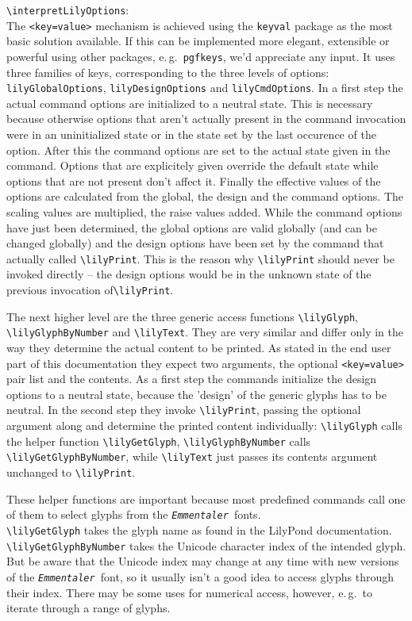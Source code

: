 \documentclass{article}
\newcommand*{\emmentaler}{\texttt{\textit{Emmentaler }}}
\newcommand*{\cmd}[1]{\texttt{\textbackslash #1}}
\begin{document}
\cmd{interpretLilyOptions}:\\
The \texttt{<key=value>} mechanism is achieved using the \texttt{keyval} package as the most basic solution available.
{\color{red} If this can be implemented more elegant, extensible or powerful using other packages, e.\,g.\ \texttt{pgfkeys}, we'd appreciate any input.}
It uses three families of keys, corresponding to the three levels of options:
\texttt{lilyGlobalOptions}, \texttt{lilyDesignOptions} and \texttt{lilyCmdOptions}.
In a first step the actual command options are initialized to a neutral state.
This is necessary because otherwise options that aren't actually present in the command invocation were in an uninitialized state or in the state set by the last occurence of the option.
After this the command options are set to the actual state given in the command.
Options that are explicitely given override the default state while options that are not present don't affect it.
Finally the effective values of the options are calculated from the global, the design and the command options. 
The scaling values are multiplied, the raise values added.
While the command options have just been determined, the global options are valid globally (and can be changed globally) and the design options have been set by the command that actually called \cmd{lilyPrint}.
This is the reason why \cmd{lilyPrint} should never be invoked directly -- the design options would be in the unknown state of the previous invocation of\cmd{lilyPrint}.

\medskip
The next higher level are the three generic access functions \cmd{lilyGlyph}, \cmd{lilyGlyphByNumber} and \cmd{lilyText}.
They are very similar and differ only in the way they determine the actual content to be printed.
As stated in the end user part of this documentation they expect two arguments, the optional \texttt{<key=value>} pair list and the contents.
As a first step the commands initialize the design options to a neutral state, because the 'design' of the generic glyphs has to be neutral.
In the second step they invoke \cmd{lilyPrint}, passing the optional argument along and determine the printed content individually:
\cmd{lilyGlyph} calls the helper function \cmd{lilyGetGlyph}, \cmd{lilyGlyphByNumber} calls \cmd{lilyGetGlyphByNumber}, while \cmd{lilyText} just passes its contents argument unchanged to \cmd{lilyPrint}.

\medskip
These helper functions are important because most predefined commands call one of them to select glyphs from the \emmentaler fonts.\\
\cmd{lilyGetGlyph} takes the glyph name as found in the LilyPond documentation.\\
\cmd{lilyGetGlyphByNumber} takes the Unicode character index of the intended glyph.
But be aware that the Unicode index may change at any time with new versions of the \emmentaler font, so it usually isn't a good idea to access glyphs through their index.
There may be some uses for numerical access, however, e.\,g.\ to iterate through a range of glyphs.
\end{document}
